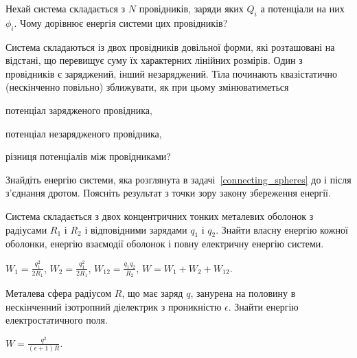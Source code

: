 \begin{problem}
    Нехай система складається з $N$ провідників, заряди яких $Q_i$ а потенціали на них $\phi_i$. Чому дорівнює енергія системи цих провідників?
\end{problem}

\begin{problem}
    Система складаються із двох провідників довільної форми, які розташовані на відстані, що перевищує суму їх характерних лінійних розмірів. Один з провідників є заряджений, інший незаряджений. Тіла починають квазістатично (нескінченно повільно) зближувати, як при цьому змінюватиметься
	\begin{enumerate*}[label=\alph*)]
		\item  потенціал зарядженого провідника,
		\item  потенціал незарядженого провідника,
		\item різниця потенціалів між провідниками?
	\end{enumerate*}
\end{problem}


\begin{problem}
Знайдіть енергію системи, яка розглянута в задачі~\ref{connecting_spheres} до і після з'єднання дротом. Поясніть результат з точки зору закону збереження енергії.
\end{problem}

\begin{problem}%
Система складається з двох концентричних тонких металевих оболонок з радіусами $R_1$ і $R_2$ і відповідними зарядами $q_1$ і $q_2$. Знайти власну енергію кожної оболонки, енергію взаємодії оболонок і повну електричну енергію системи.
\begin{solution}
	$W_1 = \frac{q_1^2}{2R_1}$, $W_2 = \frac{q_1^2}{2R_1}$, $W_{12} = \frac{q_1q_2}{R_2}$, $W = W_1 + W_2 + W_{12}$.
\end{solution}
\end{problem}

\begin{problem}
Металева сфера радіусом $R$, що має заряд $q$, занурена на половину в нескінченний ізотропний діелектрик з проникністю $\epsilon$.
Знайти енергію електростатичного поля.
\begin{solution}
	$W = \frac{q^2}{(\epsilon + 1)R}$.
\end{solution}
\end{problem}

